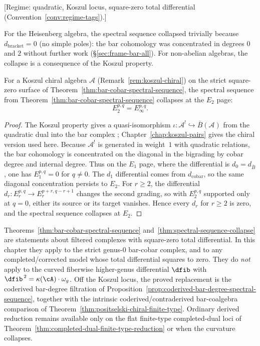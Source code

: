 \begin{theorem}\label{thm:spectral-sequence-collapse}
\textup{[Regime: quadratic, Koszul locus, square-zero total differential
\textup{(}Convention~\textup{\ref{conv:regime-tags})}.]}

For the Heisenberg algebra, the spectral sequence collapsed trivially because $d_{\mathrm{bracket}} = 0$ (no simple poles): the bar cohomology was concentrated in degrees $0$ and $2$ without further work (\S\ref{sec:frame-bar-all}). For non-abelian algebras, the collapse is a consequence of the Koszul property.

For a Koszul chiral algebra $\mathcal{A}$ (Remark~\ref{rem:koszul-chiral}) on the
strict square-zero surface of Theorem~\ref{thm:bar-cobar-spectral-sequence}, the spectral sequence from
Theorem~\ref{thm:bar-cobar-spectral-sequence} collapses at the $E_2$ page:
\[E_2^{p,q} = E_\infty^{p,q}.\]
\end{theorem}

\begin{proof}
The Koszul property gives a quasi-isomorphism
$\iota\colon \mathcal{A}^! \hookrightarrow \bar{B}(\mathcal{A})$ from
the quadratic dual into the bar complex
\cite[Theorem~3.4.1]{LV12}; Chapter~\ref{chap:koszul-pairs} gives the
chiral version used here.
Because $\mathcal{A}^!$ is generated in weight~$1$ with quadratic
relations, the bar cohomology is concentrated on the diagonal in the
bigrading by cobar degree and internal degree.
Thus on the $E_1$ page, where the differential is
$d_0=d_{\bar B}$, one has $E_1^{p,q}=0$ for $q\neq 0$.
The $d_1$ differential comes from $d_{\text{cobar}}$, so the same
diagonal concentration persists to $E_2$.
For $r\ge 2$, the differential
$d_r\colon E_r^{p,q}\to E_r^{p+r,q-r+1}$ changes the second grading,
so with $E_2^{p,q}$ supported only at $q=0$, either its source or its
target vanishes.
Hence every $d_r$ for $r\ge 2$ is zero, and the spectral sequence
collapses at $E_2$.
\end{proof}

\begin{remark}
\label{rem:spectral-sequence-square-zero-boundary}
Theorems~\ref{thm:bar-cobar-spectral-sequence}
and~\ref{thm:spectral-sequence-collapse} are statements about filtered
complexes with square-zero total differential. In this chapter they
apply to the strict genus-$0$ bar-cobar complex, and to any
completed/corrected model whose total differential squares to zero.
They do \emph{not} apply to the curved fiberwise higher-genus
differential $\dfib$ with
$\dfib^{\,2} = \kappa(\cA)\cdot\omega_g$. Off the Koszul locus, the
proved replacement is the coderived bar-degree filtration of
Proposition~\ref{prop:coderived-bar-degree-spectral-sequence},
together with the intrinsic coderived/contraderived bar-coalgebra
comparison of Theorem~\ref{thm:positselski-chiral-finite-type}. Ordinary
derived reduction remains available only on the flat finite-type
completed-dual loci of Theorem~\ref{thm:completed-dual-finite-type-reduction}
or when the curvature collapses.
\end{remark}

